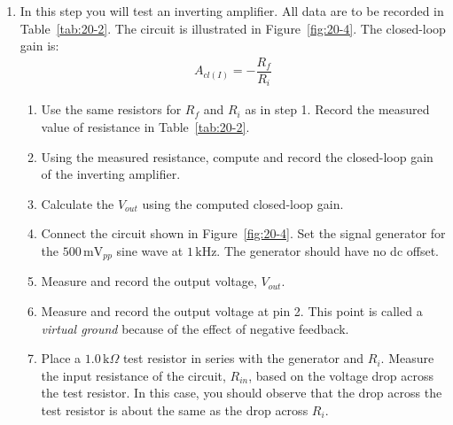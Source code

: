 \documentclass[11pt]{article}
\begin{document}
\begin{enumerate}[resume, label=\arabic*.]
    \item In this step you will test an inverting amplifier. All data are to be recorded in Table~\ref{tab:20-2}. The circuit is illustrated in Figure~\ref{fig:20-4}. The closed-loop gain is:
    \begin{align*}
    A_{cl(I)} = -\dfrac{R_f}{R_i}
    \end{align*}
    \begin{enumerate}[label=\alph*.]
        \item Use the same resistors for $R_f$ and $R_i$ as in step 1. Record the measured value of resistance in Table~\ref{tab:20-2}.
        \item Using the measured resistance, compute and record the closed-loop gain of the inverting amplifier.
        \item Calculate the $V_{out}$ using the computed closed-loop gain.
        \item Connect the circuit shown in Figure~\ref{fig:20-4}. Set the signal generator for the $500\,\text{mV}_{pp}$ sine wave at $1\,\text{kHz}$. The generator should have no dc offset.
        \item Measure and record the output voltage, $V_{out}$.
        \item Measure and record the output voltage at pin 2. This point is called a \textit{virtual ground} because of the effect of negative feedback.
        \item Place a $1.0\,\text{k}\Omega$ test resistor in series with the generator and $R_i$. Measure the input resistance of the circuit, $R_{in}$, based on the voltage drop across the test resistor. In this case, you should observe that the drop across the test resistor is about the same as the drop across $R_i$.
    \end{enumerate}
\end{enumerate}

\begin{table}[h!]
\centering
\caption{Inverting amplifier measurements}
\label{tab:20-2}
\end{table}
\end{document}
